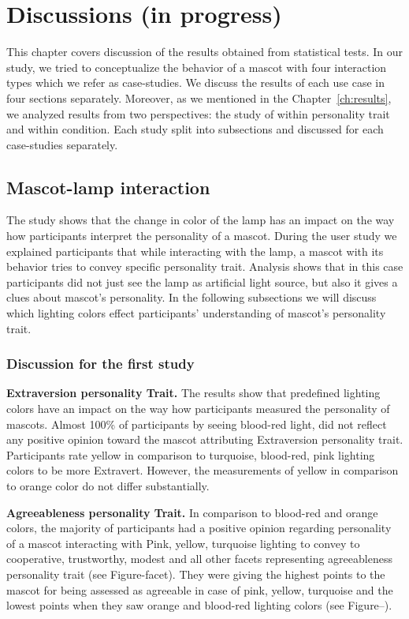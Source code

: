 \chapter{Discussions (in progress)}
\label{ch:discussions}
This chapter covers discussion of the results obtained from statistical tests.
In our study, we tried to conceptualize the behavior of a mascot with four interaction types which we refer as case-studies.
We discuss the results of each use case in four sections separately.
Moreover, as we mentioned in the Chapter~\ref{ch:results}, we analyzed results from two perspectives: the study of
within personality trait and within condition.
Each study split into subsections and discussed for each case-studies separately.

\section{Mascot-lamp interaction}
\label{sec:mascot-lamp-interaction}
The study shows that the change in color of the lamp has an impact on the way
how participants interpret the personality of a mascot.
During the user study we explained participants that while interacting with the lamp,
a mascot with its behavior tries to convey specific personality trait.
Analysis shows that in this case participants did not just see the lamp as artificial light source,
but also it gives a clues about mascot's personality.
In the following subsections we will discuss which lighting colors effect participants' understanding
of mascot's personality trait.

\subsection{Discussion for the first study}
\label{subsec:discussion-for-the-first-study}

\par\textbf{Extraversion personality Trait.}
The results show that predefined lighting colors have an impact on the
way how participants measured the personality of mascots.
Almost 100\% of participants by seeing blood-red light, did not reflect any positive opinion toward the mascot
attributing Extraversion personality trait.
Participants rate yellow in comparison to turquoise, blood-red, pink lighting colors to be more Extravert.
However, the measurements of yellow in comparison to orange color do not differ substantially.

\par\textbf{Agreeableness personality Trait.}
In comparison to blood-red and orange colors, the majority of participants had a positive opinion
regarding personality of a mascot interacting with Pink, yellow, turquoise lighting to convey to cooperative,
trustworthy, modest and all other facets representing agreeableness personality trait (see Figure-facet).
They were giving the highest points to the mascot for being assessed as agreeable
in case of pink, yellow, turquoise and the lowest points when they saw orange and blood-red
lighting colors (see Figure--).

